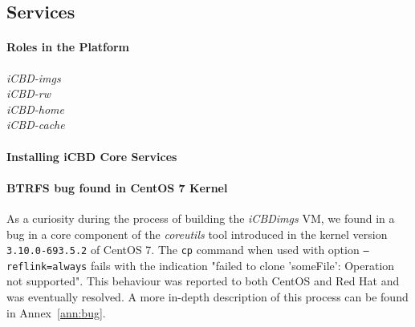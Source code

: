 
\subsection{Services}
\label{sub:impl_cache_services}

\paragraph{Roles in the Platform}
\label{par:impl_roles}

\begin{description}
	\item [\textit{iCBD-imgs}]
	\item [\textit{iCBD-rw}]
	\item [\textit{iCBD-home}]
	\item [\textit{iCBD-cache}]
\end{description}


\paragraph{Installing iCBD Core Services}
\label{par:impl_install_icbd_core}

\paragraph{BTRFS bug found in CentOS 7 Kernel}
\label{par:impl_centos_bug}

As a curiosity during the process of building the \textit{iCBDimgs} VM, we found in a bug in a core component of the \textit{coreutils} tool introduced in the kernel version \texttt{3.10.0-693.5.2} of CentOS 7. The \texttt{cp} command when used with option \texttt{--reflink=always} fails with the indication "failed to clone 'someFile': Operation not supported". This behaviour was reported to both CentOS and Red Hat and was eventually resolved. A more in-depth description of this process can be found in Annex~\ref{ann:bug}.







